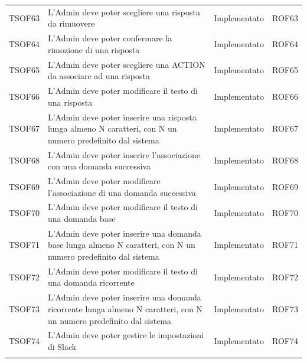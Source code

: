 \documentclass[../PianoDiQualifica_v4.0.0.tex]{subfiles}
\begin{document}
\begin{longtable}[c] { >{\centering\arraybackslash}p{2cm} p{7cm} >{\centering\arraybackslash}p{4cm} >{\centering\arraybackslash}p{2cm}}
			\addlinespace[0.3em]
			\midrule
			\addlinespace[0.3em]
			TSOF63 & L'Admin deve poter scegliere una risposta da rimuovere & Implementato & ROF63 \\
			\addlinespace[0.3em]
			\midrule
			\addlinespace[0.3em]
			TSOF64 & L'Admin deve poter confermare la rimozione di una risposta & Implementato & ROF64 \\
			\addlinespace[0.3em]
			\midrule
			\addlinespace[0.3em]
			TSOF65 & L'Admin deve poter scegliere una ACTION da associare ad una risposta & Implementato & ROF65 \\
			\addlinespace[0.3em]
			\midrule
			\addlinespace[0.3em]
			TSOF66 & L'Admin deve poter modificare il testo di una risposta & Implementato & ROF66 \\
			\addlinespace[0.3em]
			\midrule
			\addlinespace[0.3em]
			TSOF67 & L'Admin deve poter inserire una risposta lunga almeno N caratteri, con N un numero predefinito dal sistema & Implementato & ROF67 \\
			\addlinespace[0.3em]
			\midrule
			\addlinespace[0.3em]
			TSOF68 & L'Admin deve poter inserire l'associazione con una domanda successiva & Implementato & ROF68 \\
			\addlinespace[0.3em]
			\midrule
			\addlinespace[0.3em]
			TSOF69 & L'Admin deve poter modificare l'associazione di una domanda successiva	 & Implementato & ROF69 \\
			\addlinespace[0.3em]
			\midrule
			\addlinespace[0.3em]
			TSOF70 & L'Admin deve poter modificare il testo di una domanda base & Implementato & ROF70 \\
			\addlinespace[0.3em]
			\midrule
			\addlinespace[0.3em]
			TSOF71 & L'Admin deve poter inserire una domanda base lunga almeno N caratteri, con N un numero predefinito dal sistema & Implementato & ROF71 \\
			\addlinespace[0.3em]
			\midrule
			\addlinespace[0.3em]
			TSOF72 & L'Admin deve poter modificare il testo di una domanda ricorrente & Implementato & ROF72 \\
			\addlinespace[0.3em]
			\midrule
			\addlinespace[0.3em]
			TSOF73 & L’Admin deve poter inserire una domanda ricorrente lunga almeno N caratteri, con N un numero predefinito dal sistema & Implementato & ROF73 \\
			\addlinespace[0.3em]
			\midrule
			\addlinespace[0.3em]
			TSOF74 & L'Admin deve poter gestire le impostazioni di Slack & Implementato & ROF74 \\
			\addlinespace[0.3em]
			\midrule
			\addlinespace[0.3em]

\end{longtable}
\end{document}
